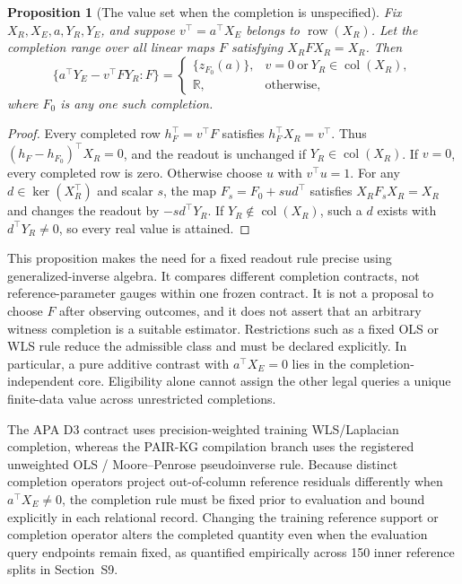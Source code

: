 \documentclass[11pt]{article}
\newtheorem{proposition}{Proposition}
\begin{document}
\begin{proposition}[The value set when the completion is unspecified]
\label{prop:completionvalueset}
Fix $X_R,X_E,a,Y_R,Y_E$, and suppose $v^\top=a^\top X_E$ belongs to $\operatorname{row}(X_R)$. Let the completion range over all linear maps $F$ satisfying $X_RFX_R=X_R$. Then
\[
\{a^\top Y_E-v^\top FY_R:F\}
=\begin{cases}
\{z_{F_0}(a)\},&v=0\ \text{or}\ Y_R\in\operatorname{col}(X_R),\\
\mathbb R,&\text{otherwise},
\end{cases}
\]
where $F_0$ is any one such completion.
\end{proposition}
\begin{proof}
Every completed row $h_F^\top=v^\top F$ satisfies $h_F^\top X_R=v^\top$. Thus $(h_F-h_{F_0})^\top X_R=0$, and the readout is unchanged if $Y_R\in\operatorname{col}(X_R)$. If $v=0$, every completed row is zero. Otherwise choose $u$ with $v^\top u=1$. For any $d\in\ker(X_R^\top)$ and scalar $s$, the map $F_s=F_0+sud^\top$ satisfies $X_RF_sX_R=X_R$ and changes the readout by $-s d^\top Y_R$. If $Y_R\notin\operatorname{col}(X_R)$, such a $d$ exists with $d^\top Y_R\ne0$, so every real value is attained.
\end{proof}
This proposition makes the need for a fixed readout rule precise using generalized-inverse algebra. It compares different completion contracts, not reference-parameter gauges within one frozen contract. It is not a proposal to choose $F$ after observing outcomes, and it does not assert that an arbitrary witness completion is a suitable estimator. Restrictions such as a fixed OLS or WLS rule reduce the admissible class and must be declared explicitly. In particular, a pure additive contrast with $a^\top X_E=0$ lies in the completion-independent core. Eligibility alone cannot assign the other legal queries a unique finite-data value across unrestricted completions.

The APA D3 contract uses precision-weighted training WLS/Laplacian completion, whereas the PAIR-KG compilation branch uses the registered unweighted OLS / Moore--Penrose pseudoinverse rule. Because distinct completion operators project out-of-column reference residuals differently when $a^\top X_E \neq 0$, the completion rule must be fixed prior to evaluation and bound explicitly in each relational record. Changing the training reference support or completion operator alters the completed quantity even when the evaluation query endpoints remain fixed, as quantified empirically across 150 inner reference splits in Section~S9.
\end{document}
